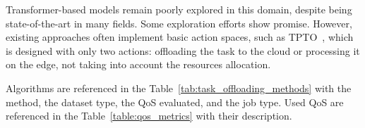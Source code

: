 \documentclass[preprint,3p,authoryear]{elsarticle}
\begin{document}
Transformer-based models remain poorly explored in this domain, despite being state-of-the-art in many fields. Some exploration efforts show promise. However, existing approaches often implement basic action spaces, such as TPTO~\cite{gholipour_tpto_2023}, which is designed with only two actions: offloading the task to the cloud or processing it on the edge, not taking into account the resources allocation.

Algorithms are referenced in the Table~\ref{tab:task_offloading_methods} with the method, the dataset type, the QoS evaluated, and the job type. Used QoS are referenced in the Table~\ref{table:qos_metrics} with their description.



\begin{table}[h!]
\centering


\end{table}
\end{document}
